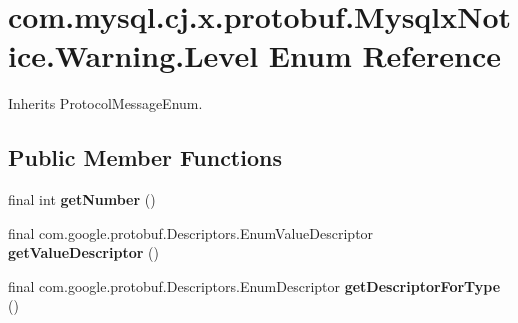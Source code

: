 \hypertarget{enumcom_1_1mysql_1_1cj_1_1x_1_1protobuf_1_1_mysqlx_notice_1_1_warning_1_1_level}{}\section{com.\+mysql.\+cj.\+x.\+protobuf.\+Mysqlx\+Notice.\+Warning.\+Level Enum Reference}
\label{enumcom_1_1mysql_1_1cj_1_1x_1_1protobuf_1_1_mysqlx_notice_1_1_warning_1_1_level}


Inherits Protocol\+Message\+Enum.

\subsection*{Public Member Functions}
\begin{DoxyCompactItemize}
\item 
\mbox{\label{enumcom_1_1mysql_1_1cj_1_1x_1_1protobuf_1_1_mysqlx_notice_1_1_warning_1_1_level_ac4bf586d483503392c195edaa179c40a}} 
final int {\bfseries get\+Number} ()
\item 
\mbox{\label{enumcom_1_1mysql_1_1cj_1_1x_1_1protobuf_1_1_mysqlx_notice_1_1_warning_1_1_level_a8eb3702cbfe1f786d1ce59f2e5b1a219}} 
final com.\+google.\+protobuf.\+Descriptors.\+Enum\+Value\+Descriptor {\bfseries get\+Value\+Descriptor} ()
\item 
\mbox{\label{enumcom_1_1mysql_1_1cj_1_1x_1_1protobuf_1_1_mysqlx_notice_1_1_warning_1_1_level_aa70611c911b61441dda9f6a72e1aad96}} 
final com.\+google.\+protobuf.\+Descriptors.\+Enum\+Descriptor {\bfseries get\+Descriptor\+For\+Type} ()
\end{DoxyCompactItemize}
